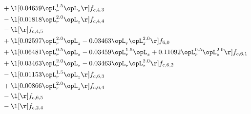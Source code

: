 \begin{alignat}{2}
& + \l[  0.04659 \opL_r^{1.5} \opL_z  \r] f_{c,4,3} \nonumber \\ 
& - \l[  0.01818 \opL_r^{2.0} \opL_z  \r] f_{c,4,4} \nonumber \\ 
& - \l[  \r] f_{c,4,5} \nonumber \\ 
& + \l[  0.02597 \opL_r^{2.0} \opL_z   -0.03463 \opL_r \opL_z^{2.0}  \r] f_{6,0} \nonumber \\ 
& + \l[  0.06481 \opL_r^{0.5} \opL_z   -0.03459 \opL_r^{1.5} \opL_z +  0.11092 \opL_r^{0.5} \opL_z^{2.0}  \r] f_{c,6,1} \nonumber \\ 
& + \l[  0.03463 \opL_r^{2.0} \opL_z   -0.03463 \opL_r \opL_z^{2.0}  \r] f_{c,6,2} \nonumber \\ 
& - \l[  0.01153 \opL_r^{1.5} \opL_z  \r] f_{c,6,3} \nonumber \\ 
& + \l[  0.00866 \opL_r^{2.0} \opL_z  \r] f_{c,6,4} \nonumber \\ 
& - \l[  \r] f_{c,6,5} \nonumber \\ 
& - \l[  \r] f_{c,2,4} \nonumber \\ 
\end{alignat} 



